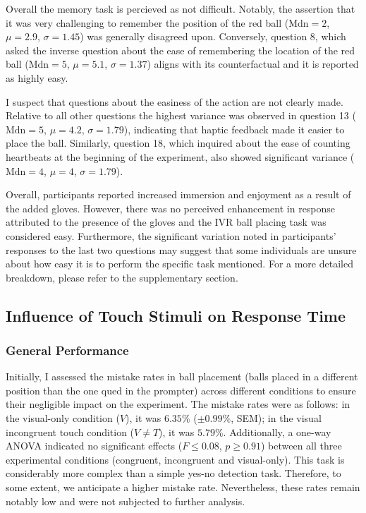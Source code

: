 \documentclass[12pt,oneside,openright]{report}
\begin{document}
Overall the memory task is percieved as not difficult. Notably, the assertion that it was very challenging to remember the position of the red ball ($\text{Mdn} = 2$, $\mu = 2.9$, $\sigma = 1.45$) was generally disagreed upon. Conversely, question 8, which asked the inverse question about the ease of remembering the location of the red ball ($\text{Mdn} = 5$, $\mu = 5.1$, $\sigma = 1.37$) aligns with its counterfactual and it is reported as highly easy. 
    
I suspect that questions about the easiness of the action are not clearly made. Relative to all other questions the highest variance was observed in question 13 ($\text{Mdn} = 5$, $\mu = 4.2$, $\sigma = 1.79$), indicating that haptic feedback made it easier to place the ball. Similarly, question 18, which inquired about the ease of counting heartbeats at the beginning of the experiment, also showed significant variance ($\text{Mdn} = 4$, $\mu = 4$, $\sigma = 1.79$). 
    
Overall, participants reported increased immersion and enjoyment as a result of the added gloves. However, there was no perceived enhancement in response attributed to the presence of the gloves and the IVR ball placing task was considered easy. Furthermore, the significant variation noted in participants' responses to the last two questions may suggest that some individuals are unsure about how easy it is to perform the specific task mentioned. For a more detailed breakdown, please refer to the supplementary section.
    
\subsection*{Influence of Touch Stimuli on Response Time}
\subsubsection*{General Performance}

Initially, I assessed the mistake rates in ball placement (balls placed in a different position than the one qued in the prompter) across different conditions to ensure their negligible impact on the experiment. The mistake rates were as follows: in the visual-only condition ($V$), it was $6.35\%$ ($\pm 0.99\%$, SEM); in the visual incongruent touch condition ($V \neq T$), it was $5.79\%$. Additionally, a one-way ANOVA indicated no significant effects ($ F \leq 0.08$, $p \geq 0.91$) between all three experimental conditions (congruent, incongruent and visual-only). This task is considerably more complex than a simple yes-no detection task. Therefore, to some extent, we anticipate a higher mistake rate. Nevertheless, these rates remain notably low and were not subjected to further analysis.
\end{document}
